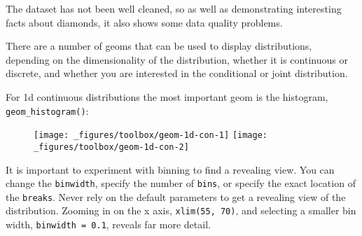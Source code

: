The dataset has not been well cleaned, so as well as demonstrating
interesting facts about diamonds, it also shows some data quality
problems.


There are a number of geoms that can be used to display distributions,
depending on the dimensionality of the distribution, whether it is
continuous or discrete, and whether you are interested in the
conditional or joint distribution. 

For 1d continuous distributions the most important geom is the
histogram, \texttt{geom\_histogram()}: 

\begin{Shaded}
\begin{Highlighting}[]
\StringTok{ }
\StringTok{  }\NormalTok{()}
\StringTok{ }
\StringTok{  }\NormalTok{(} \NormalTok{) +}\StringTok{ }
\StringTok{  }\NormalTok{(}\NormalTok{, }\NormalTok{)}
\end{Highlighting}
\end{Shaded}

\begin{figure}[H]
  \texttt{[image: \_figures/toolbox/geom-1d-con-1]}%
  \texttt{[image: \_figures/toolbox/geom-1d-con-2]}
\end{figure}

It is important to experiment with binning to find a revealing view. You
can change the \texttt{binwidth}, specify the number of \texttt{bins},
or specify the exact location of the \texttt{breaks}. Never rely on the
default parameters to get a revealing view of the distribution. Zooming
in on the x axis, \texttt{xlim(55,\ 70)}, and selecting a smaller bin
width, \texttt{binwidth\ =\ 0.1}, reveals far more detail.

